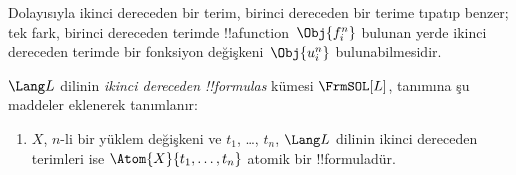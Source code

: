 \documentclass[../../../include/open-logic-section]{subfiles}
\begin{document}
\begin{explain}
Dolayısıyla ikinci dereceden bir terim, birinci dereceden bir terime tıpatıp
benzer; tek fark, birinci dereceden terimde !!a{function}~$\Obj{f^n_i}$
bulunan yerde ikinci dereceden terimde bir fonksiyon değişkeni~$\Obj{u^n_i}$
bulunabilmesidir.
\end{explain}

\begin{defn}
$\Lang L$ dilinin \emph{ikinci dereceden !!{formula}s} kümesi
$\FrmSOL[L]$,  tanımına şu maddeler
eklenerek tanımlanır:
\begin{enumerate}
\item $X$, $n$-li bir yüklem değişkeni ve $t_1$, \dots, $t_n$,
  $\Lang L$ dilinin ikinci dereceden terimleri ise
  $\Atom{X}{t_1,\ldots, t_n}$ atomik bir !!{formula}{}dür.




\end{enumerate}
\end{defn}
\end{document}
